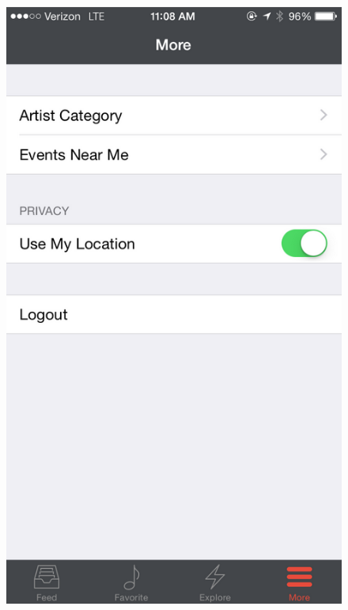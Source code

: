         \begin{figure}
        	\centering
        	\begin{minipage}{.5\textwidth}
        		\centering
        		\includegraphics[width=.7\linewidth]{./pics/app7.png}
        	\end{minipage}%
        	\begin{minipage}{.5\textwidth}
        		\centering

\end{minipage}
\end{figure}
